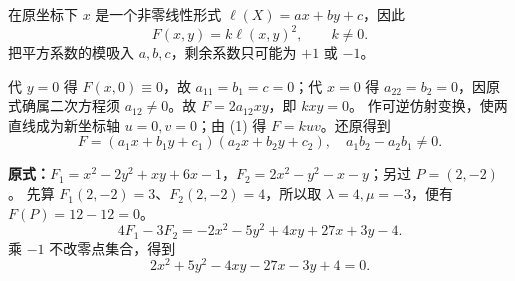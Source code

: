 在原坐标下 $x$ 是一个非零线性形式 $\ell(X)=ax+by+c$，因此
\[F(x,y)=k\ell(x,y)^2,\qquad k\ne0.
\]
把平方系数的模吸入 $a,b,c$，剩余系数只可能为 $+1$ 或 $-1$。

 代 $y=0$ 得 $F(x,0)\equiv0$，故 $a_{11}=b_1=c=0$；代 $x=0$ 得 $a_{22}=b_2=0$，因原式确属二次方程须 $a_{12}\ne0$。故 $F=2a_{12}xy$，即 $kxy=0$。
 作可逆仿射变换，使两直线成为新坐标轴 $u=0,v=0$；由 (1) 得 $F=kuv$。还原得到
\[
\boxed{F=(a_1x+b_1y+c_1)(a_2x+b_2y+c_2),\quad a_1b_2-a_2b_1\ne0.}
\]

\textbf{原式：}$F_1=x^2-2y^2+xy+6x-1$，$F_2=2x^2-y^2-x-y$；另过 $P=(2,-2)$。
先算 $F_1(2,-2)=3$、$F_2(2,-2)=4$，所以取 $\lambda=4,\mu=-3$，便有 $F(P)=12-12=0$。
\[
4F_1-3F_2=-2x^2-5y^2+4xy+27x+3y-4.
\]
乘 $-1$ 不改零点集合，得到
\[\boxed{2x^2+5y^2-4xy-27x-3y+4=0.}\]
